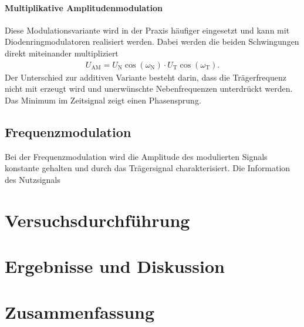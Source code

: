 \documentclass[a4paper,twoside,final]{article}
\begin{document}
\paragraph{Multiplikative Amplitudenmodulation}
Diese Modulationsvariante wird in der Praxis häufiger eingesetzt und kann mit Diodenringmodulatoren realisiert werden. Dabei werden die beiden Schwingungen direkt miteinander multipliziert
\begin{align}
    U_\text{AM} = U_\text{N} \cos(\omega_\text{N})\cdot U_\text{T} \cos(\omega_\text{T}).
\end{align}
Der Unterschied zur additiven Variante besteht darin, dass die Trägerfrequenz nicht mit erzeugt wird und unerwünschte Nebenfrequenzen unterdrückt werden. Das Minimum im Zeitsignal zeigt einen Phasensprung.

\subsection{Frequenzmodulation}
Bei der Frequenzmodulation wird die Amplitude des modulierten Signals konstante gehalten und durch das Trägersignal charakterisiert. Die Information des Nutzsignals


\section{Versuchsdurchführung} \label{sec:Versuchsdurchführung}

\newpage
\section{Ergebnisse und Diskussion}


\section{Zusammenfassung}
\end{document}
